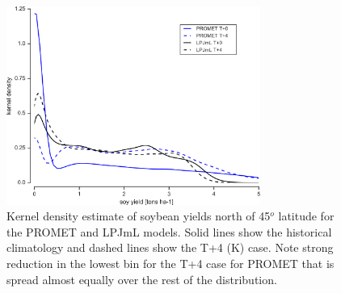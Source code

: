 \documentclass[gmd, manuscript]{copernicus} %
\begin{document}
{\begin{figure}[ht]
\centering
   \includegraphics[width=8.3cm]{figures/testhighlatskde.png}
\caption{Kernel density estimate of soybean yields north of 45$^o$ latitude for the PROMET and LPJmL models. Solid lines show the historical climatology and dashed lines show the T+4 (K) case. Note strong reduction in the lowest bin for the T+4 case for PROMET that is spread almost equally over the rest of the distribution.}
\label{fig:highlat}
\end{figure}

}
\end{document}

